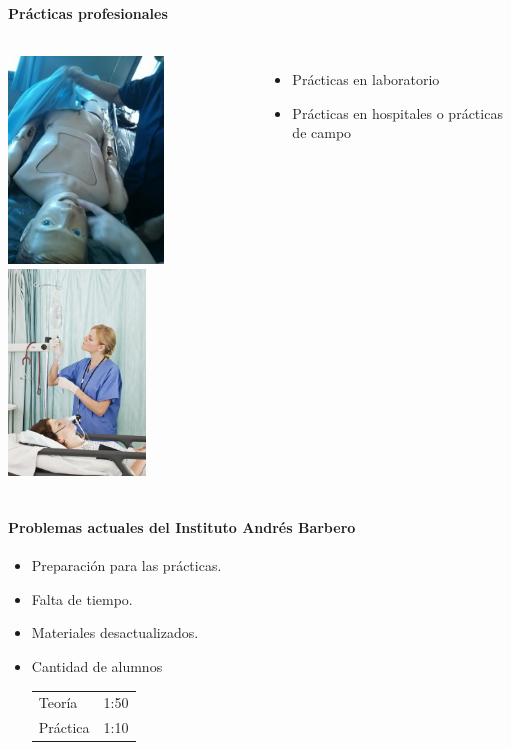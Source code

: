 \begin{frame}
\frametitle{\pagetitle}
\framesubtitle{Prácticas profesionales}

\begin{columns}
 \hspace{0.5cm}
\begin{overprint}
     \includegraphics[width=\textwidth, height=5.5cm]{../problema/iab_sala_3.jpg} 
     \includegraphics[width=\textwidth, height=5.5cm]{imagenes/practica_campo.jpg} 
\end{overprint}
 \hspace{0.5cm}
\begin{itemize}[<+->]
	\item Prácticas en laboratorio
	\item Prácticas en hospitales o prácticas de campo
\end{itemize}
\end{columns}

\end{frame}

\begin{frame}
\frametitle{\pagetitle}
\framesubtitle{Problemas actuales del Instituto Andrés Barbero}
\pause{}
\begin{itemize}[<+->]
\item Preparación para las prácticas.
\item Falta de tiempo.
\item Materiales desactualizados.
\item Cantidad de alumnos

    \bigskip

    \begin{tabular}{lr}
        \tabitem{} Teoría   & 1:50 \\
        \tabitem{} Práctica & 1:10 \\
    \end{tabular}
\end{itemize}
\end{frame}


